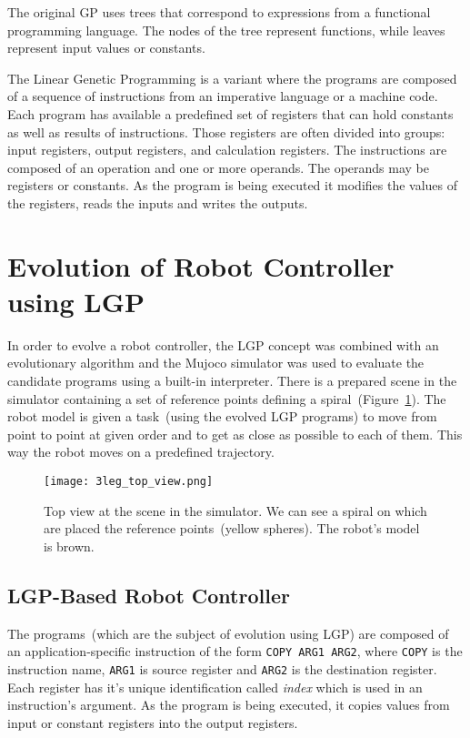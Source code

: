 \documentclass{ExcelAtFIT}
\begin{document}
The original GP uses trees that correspond to expressions from a functional programming language.
The nodes of the tree represent functions, while leaves represent input values or constants.

The Linear Genetic Programming is a variant where the programs are composed of a sequence of instructions from an imperative language or a machine code.
Each program has available a predefined set of registers that can hold constants as well as results of instructions.
Those registers are often divided into groups: input registers, output registers, and calculation registers.
The instructions are composed of an operation and one or more operands.
The operands may be registers or constants.
As the program is being executed it modifies the values of the registers, reads the inputs and writes the outputs.


\section{Evolution of Robot Controller using LGP}
\label{sec:ExperimentsSetup}
In order to evolve a robot controller, the LGP concept was combined with an evolutionary algorithm and the Mujoco simulator\cite{Todorov2012} was used to evaluate the candidate programs using a built-in interpreter.
There is a prepared scene in the simulator containing a set of reference points defining a spiral~(Figure~\ref{fig:SpiralTop}).
The robot model is given a task~(using the evolved LGP programs) to move from point to point at given order and to get as close as possible to each of them.
This way the robot moves on a predefined trajectory.

\begin{figure}[h]
\centering
{\texttt{[image: 3leg\_top\_view.png]}}
\caption{Top view at the scene in the simulator.
We can see a spiral on which are placed the reference points~(yellow spheres).
The robot's model is brown.
}
\label{fig:SpiralTop}
\end{figure}

\subsection{LGP-Based Robot Controller}
\label{subsec:lgp-basedRobotController}
The programs~(which are the subject of evolution using LGP) are composed of an application-specific instruction of the form \texttt{COPY ARG1 ARG2}, where \texttt{COPY} is the instruction name, \texttt{ARG1} is source register and \texttt{ARG2} is the destination register.
Each register has it's unique identification called \textit{index} which is used in an instruction's argument.
As the program is being executed, it copies values from input or constant registers into the output registers.
\end{document}
